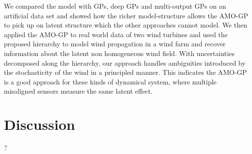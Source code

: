 We compared the model with GPs, deep GPs and multi-output GPs on an artificial data set and showed how the richer model-structure allows the AMO-GP to pick up on latent structure which the other approaches cannot model.
We then applied the AMO-GP to real world data of two wind turbines and used the proposed hierarchy to model wind propagation in a wind farm and recover information about the latent non homogeneous wind field.
With uncertainties decomposed along the hierarchy, our approach handles ambiguities introduced by the stochasticity of the wind in a principled manner.
This indicates the AMO-GP is a good approach for these kinds of dynamical system, where multiple misaligned sensors measure the same latent effect.


\section{Discussion}
\label{sec:discussion}
?
